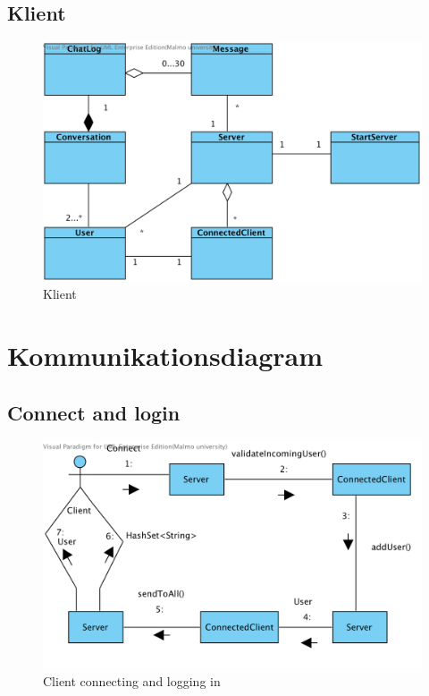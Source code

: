 \documentclass[a4paper,11pt]{article}
\begin{document}
\subsection{Klient}
	\begin{figure}[H]
		\centering
		\includegraphics[width=\textwidth]{diagram/Server.png}
		\caption{Klient}
	\end{figure}
\section{Kommunikationsdiagram}

	\subsection{Connect and login}
	\begin{figure}[H]
		\centering
		\includegraphics[width=\textwidth]{diagram/Server_ConnectAndLogin2.png}
		\caption{Client connecting and logging in}
	\end{figure}
\end{document}
